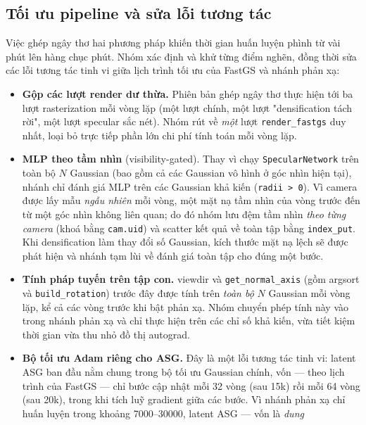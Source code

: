     \subsection{Tối ưu pipeline và sửa lỗi tương tác}
    Việc ghép ngây thơ hai phương pháp khiến thời gian huấn luyện phình từ vài phút
    lên hàng chục phút. Nhóm xác định và khử từng điểm nghẽn, đồng thời sửa các lỗi
    tương tác tinh vi giữa lịch trình tối ưu của FastGS và nhánh phản xạ:
    \begin{itemize}
        \item \textbf{Gộp các lượt render dư thừa.} Phiên bản ghép ngây thơ thực
        hiện tới ba lượt rasterization mỗi vòng lặp (một lượt chính, một lượt
        "densification tách rời", một lượt specular sắc nét). Nhóm rút về \textit{một}
        lượt \texttt{render\_fastgs} duy nhất, loại bỏ trực tiếp phần lớn chi phí
        tính toán mỗi vòng lặp.
        \item \textbf{MLP theo tầm nhìn} (visibility-gated). Thay vì chạy
        \texttt{SpecularNetwork} trên toàn bộ $N$ Gaussian (bao gồm cả các Gaussian
        vô hình ở góc nhìn hiện tại), nhánh chỉ đánh giá MLP trên các Gaussian khả
        kiến (\texttt{radii > 0}). Vì camera được lấy mẫu \textit{ngẫu nhiên} mỗi
        vòng, một mặt nạ tầm nhìn của vòng trước đến từ một góc nhìn không liên quan;
        do đó nhóm lưu đệm tầm nhìn \textit{theo từng camera} (khoá bằng
        \texttt{cam.uid}) và scatter kết quả về toàn tập bằng \texttt{index\_put}.
        Khi densification làm thay đổi số Gaussian, kích thước mặt nạ lệch sẽ được
        phát hiện và nhánh tạm lùi về đánh giá toàn tập cho đúng một bước.
        \item \textbf{Tính pháp tuyến trên tập con.} viewdir và
        \texttt{get\_normal\_axis} (gồm argsort và \texttt{build\_rotation}) trước
        đây được tính trên \textit{toàn bộ} $N$ Gaussian mỗi vòng lặp, kể cả các
        vòng trước khi bật phản xạ. Nhóm chuyển phép tính này vào trong nhánh phản
        xạ và chỉ thực hiện trên các chỉ số khả kiến, vừa tiết kiệm thời gian vừa
        thu nhỏ đồ thị autograd.
        \item \textbf{Bộ tối ưu Adam riêng cho ASG.} Đây là một lỗi tương tác tinh
        vi: latent ASG ban đầu nằm chung trong bộ tối ưu Gaussian chính, vốn — theo
        lịch trình của FastGS — chỉ bước cập nhật mỗi 32 vòng (sau 15k) rồi mỗi 64
        vòng (sau 20k), trong khi tích luỹ gradient giữa các bước. Vì nhánh phản xạ
        chỉ huấn luyện trong khoảng 7000–30000, latent ASG — vốn là \textit{dung
}
\end{itemize}
